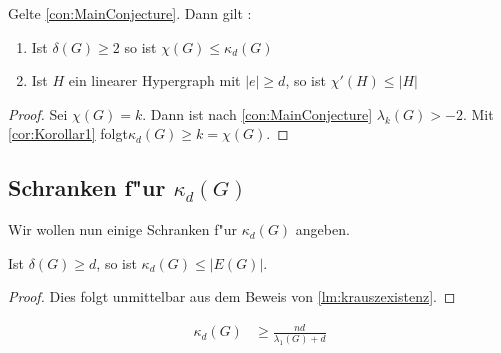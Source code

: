 \begin{theorem}
  \label{thm:MainTheorem}
  Gelte \ref{con:MainConjecture}. Dann gilt :
  \begin{enumerate}[label=(\roman*)]
    \item Ist $\delta\left( G \right) \geq 2$ so ist $\chi\left( G \right)\leq \kappa_{d}\left( G \right)$
    \item  Ist $H$ ein linearer Hypergraph mit $\left|e\right| \geq d$, so ist $\chi'\left( H \right)\leq \left|H\right| $
  \end{enumerate}
\end{theorem}

\begin{proof}
  Sei $\chi(G) = k$. Dann ist nach \ref{con:MainConjecture} $\lambda_{k}\left( G \right) > -2$. Mit \ref{cor:Korollar1} folgt$\kappa_{d}\left( G \right) \geq k = \chi\left( G \right)$.
\end{proof}


\subsection{Schranken f"ur $\kappa_d(G)$}

Wir wollen nun einige Schranken f"ur $\kappa_{d}(G)$ angeben. 
\begin{lemma}
  Ist $\delta(G) \geq d$, so ist $\kappa_{d}(G) \leq |E(G)|$. 
\end{lemma}
\begin{proof}
  Dies folgt unmittelbar aus dem Beweis von \ref{lm:krauszexistenz}. 
\end{proof}

\begin{theorem}
  \begin{align*}
    \kappa_{d}(G) &\geq \frac{nd}{\lambda_{1}(G) +d} 
  \end{align*}
  \label{thm:kappaineq1}
\end{theorem}

